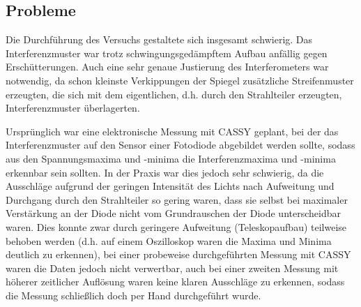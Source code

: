 \subsection{Probleme}
Die Durchführung des Versuchs gestaltete sich insgesamt schwierig. Das Interferenzmuster war trotz schwingungsgedämpftem Aufbau anfällig gegen Erschütterungen. Auch eine sehr genaue Justierung des Interferometers war notwendig, da schon kleinste Verkippungen der Spiegel zusätzliche Streifenmuster erzeugten, die sich mit dem eigentlichen, d.h. durch den Strahlteiler erzeugten, Interferenzmuster überlagerten.

Ursprünglich war eine elektronische Messung mit CASSY geplant, bei der das Interferenzmuster auf den Sensor einer Fotodiode abgebildet werden sollte, sodass aus den Spannungsmaxima und -minima die Interferenzmaxima und -minima erkennbar sein sollten.
In der Praxis war dies jedoch sehr schwierig, da die Ausschläge aufgrund der geringen Intensität des Lichts nach Aufweitung und Durchgang durch den Strahlteiler so gering waren, dass sie selbst bei maximaler Verstärkung an der Diode nicht vom Grundrauschen der Diode unterscheidbar waren. Dies konnte zwar durch geringere Aufweitung (Teleskopaufbau) teilweise behoben werden (d.h. auf einem Oszilloskop waren die Maxima und Minima deutlich zu erkennen), bei einer probeweise durchgeführten Messung mit CASSY waren die Daten jedoch nicht verwertbar, auch bei einer zweiten Messung mit höherer zeitlicher Auflösung waren keine klaren Ausschläge zu erkennen, sodass die Messung schließlich doch per Hand durchgeführt wurde.
